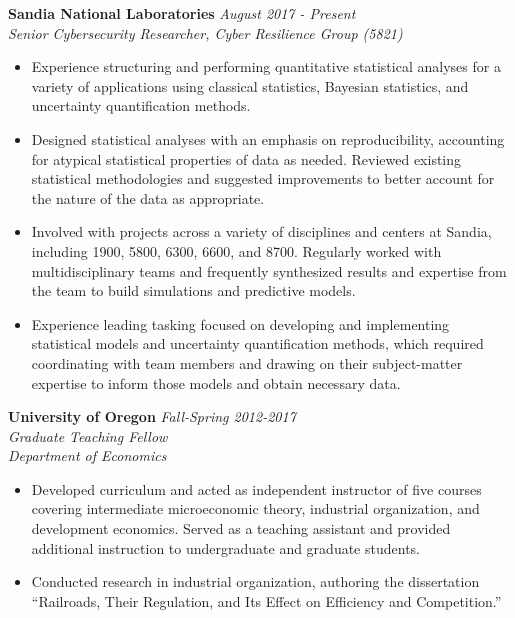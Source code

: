 \documentclass[11pt]{article}
\newenvironment{changemargin}[2]{%
  \begin{list}{}{%
    \setlength{\topsep}{0pt}%
    \setlength{\leftmargin}{#1}%
    \setlength{\rightmargin}{#2}%
    \setlength{\listparindent}{\parindent}%
    \setlength{\itemindent}{\parindent}%
    \setlength{\parsep}{\parskip}%
  }%
  \item[]}{\end{list}
}
\newenvironment{body} {
	\vspace*{-16pt}
	\begin{changemargin}{-0.25in}{-0.5in}
  }	
	{\end{changemargin}
}
\begin{document}
\begin{body}
	\vspace{14pt}
	
	\textbf{Sandia National Laboratories} \hfill \emph{August 2017 - Present}\\
	\emph{Senior Cybersecurity Researcher, Cyber Resilience Group (5821)}
	\vspace*{-4pt}
	\begin{itemize}
		\item Experience structuring and performing quantitative statistical analyses for a variety of applications using classical statistics, Bayesian statistics, and uncertainty quantification methods. 
		\item Designed statistical analyses with an emphasis on reproducibility, accounting for atypical statistical properties of data as needed. Reviewed existing statistical methodologies and suggested improvements to better account for the nature of the data as appropriate.
		\item Involved with projects across a variety of disciplines and centers at Sandia, including 1900, 5800, 6300, 6600, and 8700. Regularly worked with multidisciplinary teams and frequently synthesized results and expertise from the team to build simulations and predictive models.
		\item Experience leading tasking focused on developing and implementing statistical models and uncertainty quantification methods, which required coordinating with team members and drawing on their subject-matter expertise to inform those models and obtain necessary data.
	\end{itemize}	
	
	
	\textbf{University of Oregon} \hfill \emph{Fall-Spring 2012-2017}\\
	\emph{Graduate Teaching Fellow}\\
	\emph{Department of Economics}
	\vspace*{-4pt}
	\begin{itemize}
		\item Developed curriculum and acted as independent instructor of five courses covering intermediate microeconomic theory, industrial organization, and development economics. Served as a teaching assistant and provided additional instruction to undergraduate and graduate students.
		\item Conducted research in industrial organization, authoring the dissertation ``Railroads, Their Regulation, and Its Effect on Efficiency and Competition.''
	\end{itemize}


\end{body}
\end{document}
